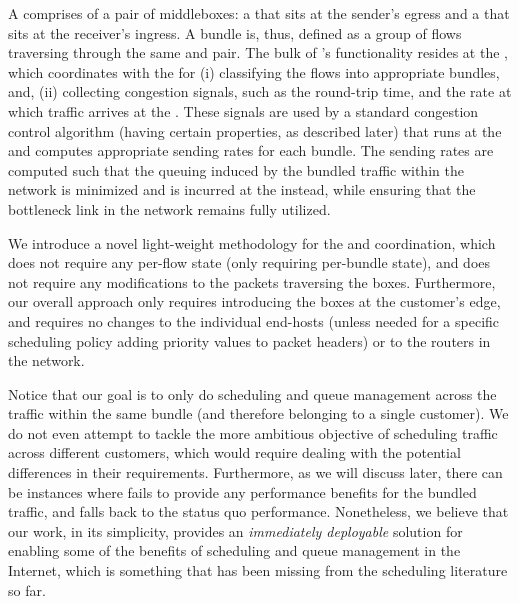  A \name comprises of a pair of middleboxes: a \inbox that sits at the sender's egress and a \outbox that sits at the receiver's ingress. A bundle is, thus, defined as a group of flows traversing through the same \inbox and \outbox pair. The bulk of \name's functionality resides at the \inbox, which coordinates with the \outbox for (i) classifying the flows into appropriate bundles, and,  (ii) collecting congestion signals, such as the round-trip time, and the rate at which traffic arrives at the \outbox. These signals are used by a standard congestion control algorithm (having certain properties, as described later) that runs at the \inbox and computes appropriate sending rates for each bundle. The sending rates are computed such that the queuing induced by the bundled traffic within the network is minimized and is incurred at the \inbox instead, while ensuring that the bottleneck link in the network remains fully utilized. 
 
 We introduce a novel light-weight methodology for the \inbox and \outbox coordination, which does not require any per-flow state (only requiring per-bundle state), and does not require any modifications to the packets traversing the \name boxes. Furthermore, our overall approach only requires introducing the \name boxes at the customer's edge, and requires no changes to the individual end-hosts (unless needed for a specific scheduling policy \eg adding priority values to packet headers) or to the routers in the network. 
 
 Notice that our goal is to only do scheduling and queue management across the traffic within the same bundle (and therefore belonging to a single customer). We do not even attempt to tackle the more ambitious objective of  scheduling traffic across different customers, which would require dealing with the potential differences in their requirements. Furthermore, as we will discuss later, there can be instances where \name fails to provide any performance benefits for the bundled traffic, and falls back to the status quo performance. Nonetheless, we believe that our work, in its simplicity, provides an \emph{immediately deployable} solution for enabling some of the benefits of scheduling and queue management in the Internet, which is something that has been missing from the scheduling literature so far. 


